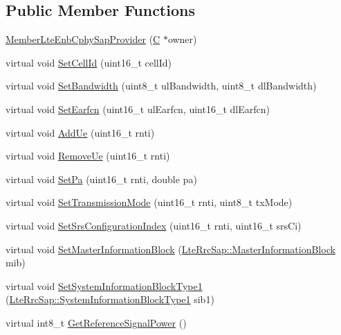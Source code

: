 \subsection*{Public Member Functions}
\begin{DoxyCompactItemize}
\item 
\hyperlink{classns3_1_1MemberLteEnbCphySapProvider_a0f2f24317e63751169a5b8bff0414f50}{Member\+Lte\+Enb\+Cphy\+Sap\+Provider} (\hyperlink{loss__COST231__small__cities__urban_8m_aaa53ca0b650dfd85c4f59fa156f7a2cc}{C} $\ast$owner)
\item 
virtual void \hyperlink{classns3_1_1MemberLteEnbCphySapProvider_a9fcbeacff59a7addcdf4040d6dfbce93}{Set\+Cell\+Id} (uint16\+\_\+t cell\+Id)
\item 
virtual void \hyperlink{classns3_1_1MemberLteEnbCphySapProvider_a4e3a4a1160ab18d8b3833918e148b17d}{Set\+Bandwidth} (uint8\+\_\+t ul\+Bandwidth, uint8\+\_\+t dl\+Bandwidth)
\item 
virtual void \hyperlink{classns3_1_1MemberLteEnbCphySapProvider_a33f7acad76c7c3b25b0edd64a6afbe8b}{Set\+Earfcn} (uint16\+\_\+t ul\+Earfcn, uint16\+\_\+t dl\+Earfcn)
\item 
virtual void \hyperlink{classns3_1_1MemberLteEnbCphySapProvider_a85454b51350671bc4ca82628884878da}{Add\+Ue} (uint16\+\_\+t rnti)
\item 
virtual void \hyperlink{classns3_1_1MemberLteEnbCphySapProvider_af321631566e29d9c0b771415a7043a8f}{Remove\+Ue} (uint16\+\_\+t rnti)
\item 
virtual void \hyperlink{classns3_1_1MemberLteEnbCphySapProvider_a4b5457c254b280e62921961d1c89a2a9}{Set\+Pa} (uint16\+\_\+t rnti, double pa)
\item 
virtual void \hyperlink{classns3_1_1MemberLteEnbCphySapProvider_a20d01f92ce79859bd4181792b2db063a}{Set\+Transmission\+Mode} (uint16\+\_\+t rnti, uint8\+\_\+t tx\+Mode)
\item 
virtual void \hyperlink{classns3_1_1MemberLteEnbCphySapProvider_a8d19fc681fc9aa7d62b3d241d3981ed2}{Set\+Srs\+Configuration\+Index} (uint16\+\_\+t rnti, uint16\+\_\+t srs\+Ci)
\item 
virtual void \hyperlink{classns3_1_1MemberLteEnbCphySapProvider_ace6c9bf7de4100be518440d716189db9}{Set\+Master\+Information\+Block} (\hyperlink{structns3_1_1LteRrcSap_1_1MasterInformationBlock}{Lte\+Rrc\+Sap\+::\+Master\+Information\+Block} mib)
\item 
virtual void \hyperlink{classns3_1_1MemberLteEnbCphySapProvider_a0a374682d50dbad62502284bcea8f18f}{Set\+System\+Information\+Block\+Type1} (\hyperlink{structns3_1_1LteRrcSap_1_1SystemInformationBlockType1}{Lte\+Rrc\+Sap\+::\+System\+Information\+Block\+Type1} sib1)
\item 
virtual int8\+\_\+t \hyperlink{classns3_1_1MemberLteEnbCphySapProvider_aa0114121782849ccab394ae22cbd576d}{Get\+Reference\+Signal\+Power} ()
\end{DoxyCompactItemize}
